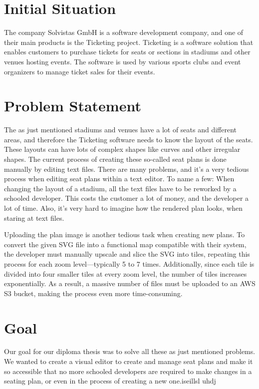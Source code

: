 \section{Initial Situation}
The company Solvistas GmbH is a software development company, and one of their main products is the Ticketing project. Ticketing is a software solution that enables customers to purchase tickets for seats or sections in stadiums and other venues hosting events. The software is used by various sports clubs and event organizers to manage ticket sales for their events.


\section{Problem Statement}
The as just mentioned stadiums and venues have a lot of seats and different areas, and therefore the Ticketing software needs to know the layout of the seats. These layouts can have lots of complex shapes like curves and other irregular shapes. The current process of creating these so-called seat plans is done manually by editing text files. There are many problems, and it's a very tedious process when editing seat plans within a text editor. To name a few: When changing the layout of a stadium, all the text files have to be reworked by a schooled developer. This costs the customer a lot of money, and the developer a lot of time. Also, it's very hard to imagine how the rendered plan looks, when staring at text files.

Uploading the plan image is another tedious task when creating new plans. To convert the given SVG file into a functional map compatible with their system, the developer must manually upscale and slice the SVG into tiles, repeating this process for each zoom level—typically 5 to 7 times. Additionally, since each tile is divided into four smaller tiles at every zoom level, the number of tiles increases exponentially. As a result, a massive number of files must be uploaded to an AWS S3 bucket, making the process even more time-consuming.

\section{Goal}
Our goal for our diploma thesis was to solve all these as just mentioned problems. We wanted to create a visual editor to create and manage seat plans and make it so accessible that no more schooled developers are required to make changes in a seating plan, or even in the process of creating a new one.iseillsl uhdj 